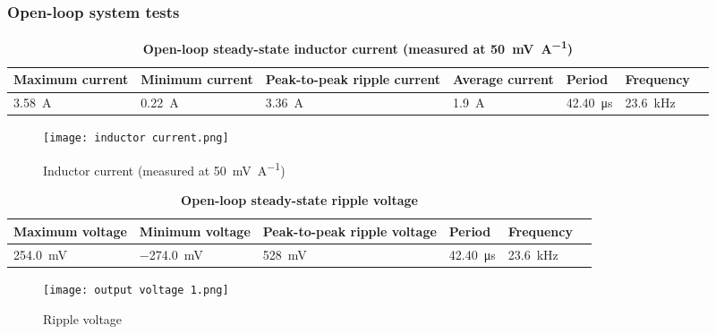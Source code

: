 \subsubsection{Open-loop system tests}
\begin{table}[H]
    \centering
    \caption{\textbf{Open-loop steady-state inductor current (measured at \qty{50}{\milli\volt\per\ampere})}}
    \begin{tabularx}{\columnwidth}{|X|X|X|X|X|X|X|}
        \hline
        Maximum current & Minimum current & Peak-to-peak ripple current & Average current & Period           & Frequency        \\
        \hline
        \qty{3.58}{\A}  & \qty{0.22}{\A}  & \qty{3.36}{\A}              & \qty{1.9}{\A}   & \qty{42.40}{\us} & \qty{23.6}{\kHz} \\
        \hline
    \end{tabularx}
    \label{table:inductor}
\end{table}
\begin{figure}[H]
    \texttt{[image: inductor current.png]}
    \centering
    \caption{Inductor current (measured at \qty{50}{\milli\volt\per\ampere})}
\end{figure}

\begin{table}[H]
    \centering
    \caption{\textbf{Open-loop steady-state ripple voltage}}
    \begin{tabularx}{\columnwidth}{|X|X|X|X|X|X|}
        \hline
        Maximum voltage  & Minimum voltage   & Peak-to-peak ripple voltage & Period           & Frequency        \\
        \hline
        \qty{254.0}{\mV} & \qty{-274.0}{\mV} & \qty{528}{\mV}              & \qty{42.40}{\us} & \qty{23.6}{\kHz} \\
        \hline
    \end{tabularx}
    \label{table:olssrv}
\end{table}
\begin{figure}[H]
    \texttt{[image: output voltage 1.png]}
    \centering
    \caption{Ripple voltage}
\end{figure}



